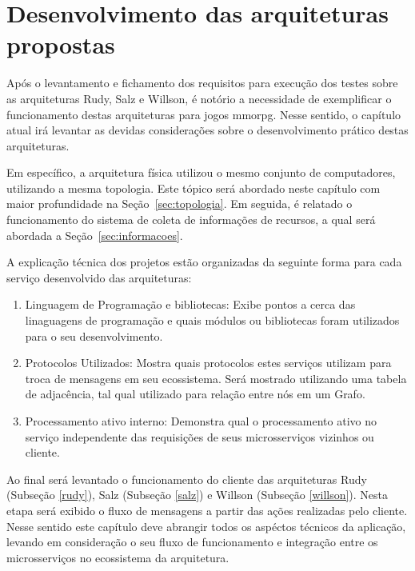  
\chapter{Desenvolvimento das arquiteturas propostas}
\label{cap5}



Após o levantamento e fichamento dos requisitos para execução dos testes sobre as arquiteturas Rudy, Salz e Willson,
é notório a necessidade de exemplificar o funcionamento destas arquiteturas para jogos \ac{mmorpg}.
Nesse sentido, o capítulo atual irá levantar as devidas considerações sobre o desenvolvimento prático destas arquiteturas.


Em específico, a arquitetura física utilizou o mesmo conjunto de computadores, utilizando a mesma topologia.
%
Este tópico será abordado neste capítulo com maior profundidade na Seção~\ref{sec:topologia}.
%
Em seguida, é relatado o funcionamento do sistema de coleta de informações de recursos, a qual será abordada a Seção~\ref{sec:informacoes}.

A explicação técnica dos projetos estão organizadas da seguinte forma para cada serviço desenvolvido das arquiteturas:


\begin{enumerate}
    \item Linguagem de Programação e bibliotecas: Exibe pontos a cerca das linaguagens de programação e quais módulos ou bibliotecas foram utilizados para o seu desenvolvimento.
    \item Protocolos Utilizados: Mostra quais protocolos estes serviços utilizam para troca de mensagens em seu ecossistema. Será mostrado utilizando uma tabela de adjacência, tal qual utilizado para relação entre nós em um Grafo.
    \item Processamento ativo interno: Demonstra qual o processamento ativo no serviço independente das requisições de seus microsserviços vizinhos ou cliente.
\end{enumerate}



Ao final será levantado o funcionamento do cliente das arquiteturas Rudy (Subseção \ref{rudy}), Salz (Subseção \ref{salz}) e Willson (Subseção \ref{willson}).
%
Nesta etapa será exibido o fluxo de mensagens a partir das ações realizadas pelo cliente.
%
Nesse sentido este capítulo deve abrangir todos os aspéctos técnicos da aplicação, levando em consideração o seu fluxo de funcionamento e integração entre os microsserviços no ecossistema da arquitetura.


